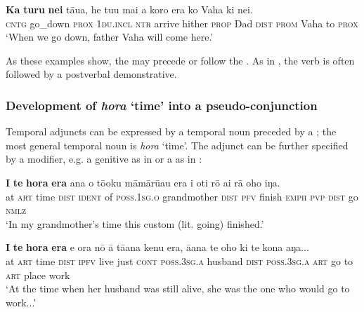 \ea\label{ex:11.229}
\gll \textbf{Ka} \textbf{turu} \textbf{nei} tāua, he tu{\ꞌ}u mai a koro era ko Vaha ki nei. \\
\textsc{cntg} go\_down \textsc{prox} \textsc{1du.incl} \textsc{ntr} arrive hither \textsc{prop} Dad \textsc{dist} \textsc{prom} Vaha to \textsc{prox} \\

\glt
‘When we go down, father Vaha will come here.’ \textstyleExampleref{[R229.187]} 
\z

As these examples show, the  may precede or follow the . As in , the verb is often followed by a postverbal demonstrative.

\subsubsection[Development of hora ‘time’ into a pseudo{}-conjunction]{Development of \textit{hora} ‘time’ into a pseudo-conjunction}\label{sec:11.6.2.3}
Temporal adjuncts can be expressed by a temporal noun preceded by a ; the most general temporal noun is \textit{hora} ‘time’. The adjunct can be further specified by a modifier, e.g. a genitive as in  or a  as in :

\ea\label{ex:11.230}
\gll \textbf{{\ꞌ}I} \textbf{te} \textbf{hora} \textbf{era} {\ꞌ}ana o tō{\ꞌ}oku māmārū{\ꞌ}au era i oti rō ai  rā oho iŋa.\\
at \textsc{art} time \textsc{dist} \textsc{ident} of \textsc{poss.1sg.o} grandmother \textsc{dist} \textsc{pfv} finish \textsc{emph} \textsc{pvp}  \textsc{dist} go \textsc{nmlz}\\

\glt 
‘In my grandmother’s time this custom (lit. going) finished.’ \textstyleExampleref{[R648.137]} 
\z

\ea\label{ex:11.231}
\gll \textbf{{\ꞌ}I} \textbf{te} \textbf{hora} \textbf{era} e ora nō {\ꞌ}ā tā{\ꞌ}ana kenu era, {\ꞌ}ā{\ꞌ}ana te oho  ki te kona aŋa...\\
at \textsc{art} time \textsc{dist} \textsc{ipfv} live just \textsc{cont} \textsc{poss.3sg.a} husband \textsc{dist} \textsc{poss.3sg.a} \textsc{art} go  to \textsc{art} place work\\

\glt
‘At the time when her husband was still alive, she was the one who would go to work...’ \textstyleExampleref{[R349.005]} 
\z

